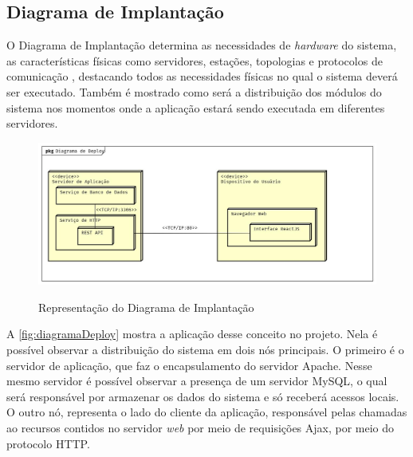 \subsection{Diagrama de Implantação}
\label{sec:titSecDiagDeploy}

O Diagrama de Implantação determina as necessidades de \textit{hardware} do sistema, as características físicas como servidores, estações, topologias e protocolos de comunicação \cite{guedes2018uml}, destacando todos as necessidades físicas no qual o sistema deverá ser executado. Também é mostrado como será a distribuição dos módulos do sistema nos momentos onde a aplicação estará sendo executada em diferentes servidores.

\begin{figure}[H]
    \centering
    \caption{Representação do Diagrama de Implantação}
    \includegraphics[width=13cm]{dados/figuras/diagramadeploy.jpg}
    \label{fig:diagramaDeploy}
\end{figure}

A \autoref{fig:diagramaDeploy} mostra a aplicação desse conceito no projeto. Nela é possível observar a distribuição do sistema em dois nós principais. O primeiro é o servidor de aplicação, que faz o encapsulamento do servidor Apache. Nesse mesmo servidor é possível observar a presença de um servidor MySQL, o qual será responsável por armazenar os dados do sistema e só receberá acessos locais.
O outro nó, representa o lado do cliente da aplicação, responsável pelas chamadas ao recursos contidos no servidor \textit{web} por meio de requisições Ajax, por meio do protocolo HTTP.
